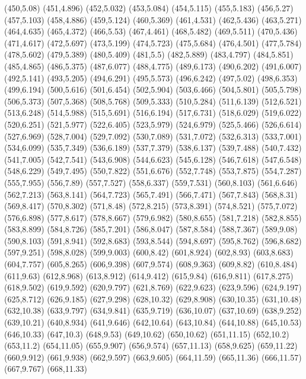 (450,5.08)
(451,4.896)
(452,5.032)
(453,5.084)
(454,5.115)
(455,5.183)
(456,5.27)
(457,5.103)
(458,4.886)
(459,5.124)
(460,5.369)
(461,4.531)
(462,5.436)
(463,5.271)
(464,4.635)
(465,4.372)
(466,5.53)
(467,4.461)
(468,5.482)
(469,5.511)
(470,5.436)
(471,4.617)
(472,5.697)
(473,5.199)
(474,5.723)
(475,5.684)
(476,4.501)
(477,5.784)
(478,5.602)
(479,5.389)
(480,5.409)
(481,5.5)
(482,5.889)
(483,4.797)
(484,5.851)
(485,4.865)
(486,5.375)
(487,6.077)
(488,4.775)
(489,6.173)
(490,6.202)
(491,6.007)
(492,5.141)
(493,5.205)
(494,6.291)
(495,5.573)
(496,6.242)
(497,5.02)
(498,6.353)
(499,6.194)
(500,5.616)
(501,6.454)
(502,5.904)
(503,6.466)
(504,5.801)
(505,5.798)
(506,5.373)
(507,5.368)
(508,5.768)
(509,5.333)
(510,5.284)
(511,6.139)
(512,6.521)
(513,6.248)
(514,5.988)
(515,5.691)
(516,6.194)
(517,6.731)
(518,6.029)
(519,6.022)
(520,6.251)
(521,5.977)
(522,6.405)
(523,5.979)
(524,6.979)
(525,5.466)
(526,6.614)
(527,6.969)
(528,7.004)
(529,7.092)
(530,7.089)
(531,7.072)
(532,6.313)
(533,7.001)
(534,6.099)
(535,7.349)
(536,6.189)
(537,7.379)
(538,6.137)
(539,7.488)
(540,7.432)
(541,7.005)
(542,7.541)
(543,6.908)
(544,6.623)
(545,6.128)
(546,7.618)
(547,6.548)
(548,6.229)
(549,7.495)
(550,7.822)
(551,6.676)
(552,7.748)
(553,7.875)
(554,7.287)
(555,7.955)
(556,7.89)
(557,7.527)
(558,6.337)
(559,7.531)
(560,8.103)
(561,6.646)
(562,7.213)
(563,8.141)
(564,7.723)
(565,7.491)
(566,7.471)
(567,7.843)
(568,8.31)
(569,8.417)
(570,8.302)
(571,8.48)
(572,8.215)
(573,8.391)
(574,8.521)
(575,7.072)
(576,6.898)
(577,8.617)
(578,8.667)
(579,6.982)
(580,8.655)
(581,7.218)
(582,8.855)
(583,8.899)
(584,8.726)
(585,7.201)
(586,8.047)
(587,8.584)
(588,7.367)
(589,9.08)
(590,8.103)
(591,8.941)
(592,8.683)
(593,8.544)
(594,8.697)
(595,8.762)
(596,8.682)
(597,9.251)
(598,8.028)
(599,9.003)
(600,8.42)
(601,8.924)
(602,8.93)
(603,8.683)
(604,7.757)
(605,8.265)
(606,9.398)
(607,9.574)
(608,9.363)
(609,8.82)
(610,8.484)
(611,9.63)
(612,8.968)
(613,8.912)
(614,9.412)
(615,9.84)
(616,9.811)
(617,8.275)
(618,9.502)
(619,9.592)
(620,9.797)
(621,8.769)
(622,9.623)
(623,9.596)
(624,9.197)
(625,8.712)
(626,9.185)
(627,9.298)
(628,10.32)
(629,8.908)
(630,10.35)
(631,10.48)
(632,10.38)
(633,9.797)
(634,9.841)
(635,9.719)
(636,10.07)
(637,10.69)
(638,9.252)
(639,10.21)
(640,8.934)
(641,9.646)
(642,10.64)
(643,10.84)
(644,10.88)
(645,10.53)
(646,10.33)
(647,10.3)
(648,9.53)
(649,10.62)
(650,10.62)
(651,11.15)
(652,10.2)
(653,11.2)
(654,11.05)
(655,9.907)
(656,9.574)
(657,11.13)
(658,9.625)
(659,11.22)
(660,9.912)
(661,9.938)
(662,9.597)
(663,9.605)
(664,11.59)
(665,11.36)
(666,11.57)
(667,9.767)
(668,11.33)
